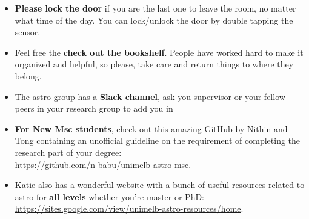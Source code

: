 \documentclass[11pt, oneside, a4paper]{article}
\newcommand{\tipscolor}{ForestGreen}
\begin{document}
\begin{tcolorbox}[colback=\tipscolor!5!white,colframe=\tipscolor!50!white,title={Tips \& Reminders}]
    \begin{itemize}
        \item \textbf{Please lock the door} if you are the last one to leave the room, no matter what time of the day. You can lock/unlock the door by double tapping the sensor.
        \item Feel free the \textbf{check out the bookshelf}. People have worked hard to make it organized and helpful, so please, take care and return things to where they belong.
        \item The astro group has a \textbf{Slack channel}, ask you supervisor or your fellow peers in your research group to add you in
        \item \textbf{For New Msc students}, check out this amazing GitHub by Nithin and Tong containing an unofficial guideline on the requirement of completing the research part of your degree:
        \\
        \url{https://github.com/n-babu/unimelb-astro-msc}.
        \item Katie also has a wonderful website with a bunch of useful resources related to astro for \textbf{all levels} whether you're master or PhD: 
        \\
        \url{https://sites.google.com/view/unimelb-astro-resources/home}.
        \end{itemize}
\end{tcolorbox} 
\end{document}
